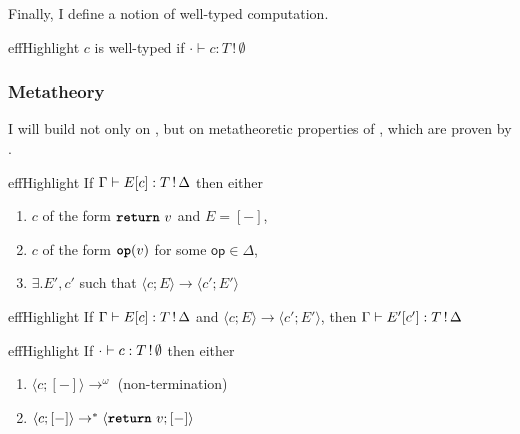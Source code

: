 Finally, I define a notion of well-typed computation. 
\begin{definition}{effHighlight}
  $c$ is well-typed if $\cdot \vdash {c}: {T \, ! \, \emptyset}$
\end{definition}

\subsubsection{Metatheory}
I will build not only on \efflang{}, but on metatheoretic properties of \efflang{}, which are proven by \citet{bauer-2014}.

\renewcommand{\effconfiguration}[2]{\langle {#1}; {#2} \rangle}
\renewcommand{\transition}[2]{#1 \rightarrow #2}

\begin{theorem}[Progress]{effHighlight}\label{thm:progress}
If $\type{E[c]}{\effectType{T}}$ then either 
\begin{enumerate}
\item $c$ of the form $\return{v}$ and $E = [-]$,
\item $c$ of the form $\op{v}$ for some $\textsf{op} \in \Delta$,
\item $\exists. E', c'$ such that $\transition{\effconfiguration{c}{E}}{\effconfiguration{c'}{E'}}$
\end{enumerate}
\end{theorem}
\vspace{-\baselineskip}
\begin{theorem}[Preservation]{effHighlight}\label{thm:preservation}
If $\type{E[c]}{\effectType{T}}$ and $\transition{\effconfiguration{c}{E}}{\effconfiguration{c'}{E'}}$, then $\type{E'[c']}{\effectType{T}}$
\end{theorem}
\vspace{-\baselineskip}
\begin{corollary}{effHighlight}\label{thm:type-safety}
  If $\cdot \vdash {c}: {\effectType[\emptyset]{T}}$ then either 
\begin{enumerate}
\item $\langle c; [-] \rangle \to^{\omega}$ (non-termination)
\item $\langle c; [-] \rangle \to^{*} \langle \return{v}; [-] \rangle$
\end{enumerate}
\end{corollary}

\newcommand{\contextequiv}{\cong_{\text{\emph{ctx}}}}


